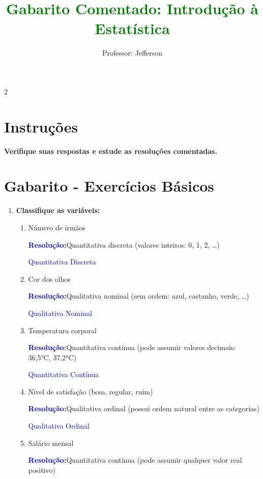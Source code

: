 \documentclass[11pt]{article}
\title{\textcolor{green}{Gabarito Comentado: Introdução à Estatística}}
\author{Professor: Jefferson}
\date{}
\newcommand{\respostaTxt}[1]{\textcolor{blue}{#1}}           %
\newcommand{\resolucao}{\textbf{\textcolor{blue}{Resolução:}}}
\begin{document}
\maketitle
\vspace{-1cm}

\begin{multicols}{2}

\section*{Instruções}
\textbf{Verifique suas respostas e estude as resoluções comentadas.}

\section*{Gabarito - Exercícios Básicos}

\begin{enumerate}[leftmargin=*]

\item \textbf{Classifique as variáveis:}

\begin{enumerate}[label=\alph*)]
\item Número de irmãos

\resolucao Quantitativa discreta (valores inteiros: 0, 1, 2, \ldots)

\respostaTxt{Quantitativa Discreta}

\item Cor dos olhos

\resolucao Qualitativa nominal (sem ordem: azul, castanho, verde, \ldots)

\respostaTxt{Qualitativa Nominal}

\item Temperatura corporal

\resolucao Quantitativa contínua (pode assumir valores decimais: 36,5°C, 37,2°C)

\respostaTxt{Quantitativa Contínua}

\item Nível de satisfação (bom, regular, ruim)

\resolucao Qualitativa ordinal (possui ordem natural entre as categorias)

\respostaTxt{Qualitativa Ordinal}

\item Salário mensal

\resolucao Quantitativa contínua (pode assumir qualquer valor real positivo)


\end{enumerate}
\end{enumerate}
\end{multicols}
\end{document}
